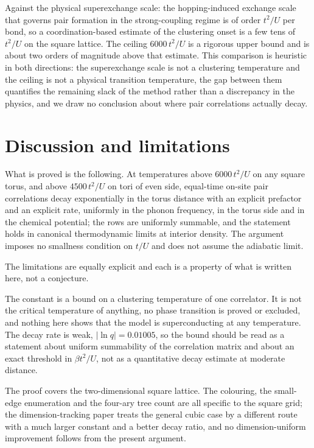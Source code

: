 \documentclass[11pt]{article}
\theoremstyle{plain}
\theoremstyle{definition}
\begin{document}
Against the physical superexchange scale: the hopping-induced exchange scale that
governs pair formation in the strong-coupling regime is of order $t^{2}/U$
per bond, so a coordination-based estimate of the clustering
onset is a few tens of $t^{2}/U$ on the square lattice. The ceiling $6000\,t^{2}/U$ is
a rigorous upper bound and is about two orders of magnitude above that estimate. This
comparison is heuristic in both directions: the superexchange scale is not a
clustering temperature and the ceiling is not a physical transition temperature, the
gap between them quantifies the remaining slack of the method rather than a
discrepancy in the physics, and we draw no conclusion about where pair correlations
actually decay.

\section{Discussion and limitations}\label{sec:discussion}

What is proved is the following. At temperatures above $6000\,t^{2}/U$ on any square
torus, and above $4500\,t^{2}/U$ on tori of even side, equal-time on-site pair
correlations decay exponentially in the torus distance with an explicit prefactor and
an explicit rate, uniformly in the phonon frequency, in the torus side and in the
chemical potential; the rows are uniformly summable, and the statement holds in
canonical thermodynamic limits at interior density. The argument imposes no smallness
condition on $t/U$ and does not assume the adiabatic limit.

The limitations are equally explicit and each is a property of what is written here,
not a conjecture.

The constant is a bound on a clustering temperature of one correlator. It is not the
critical temperature of anything, no phase transition is proved or excluded, and
nothing here shows that the model is superconducting at any temperature. The decay
rate is weak, $|\ln q|=0.01005$, so the bound should be read as a statement about
uniform summability of the correlation matrix and about an exact threshold in
$\beta t^{2}/U$, not as a quantitative decay estimate at moderate distance.

The proof covers the two-dimensional square lattice. The colouring, the small-edge
enumeration and the four-ary tree count are all specific to the square grid; the
dimension-tracking paper \cite{rens2026b} treats the general cubic case by a different
route with a much larger constant and a better decay ratio, and no dimension-uniform
improvement follows from the present argument.
\end{document}
